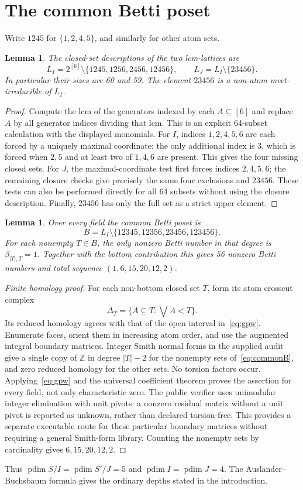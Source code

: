 \documentclass[11pt,a4paper]{article}
\newtheorem{lemma}[theorem]{Lemma}
\theoremstyle{remark}\newtheorem{remark}[theorem]{Remark}
\DeclareMathOperator{\pdim}{pdim}
\begin{document}
\section{The common Betti poset}\label{sec:betti}
Write $1245$ for $\{1,2,4,5\}$, and similarly for other atom sets.
\begin{lemma}\label{lem:lattices}
The closed-set descriptions of the two lcm-lattices are
\[
L_I=2^{[6]}\setminus\{1245,1256,2456,12456\},\qquad
L_J=L_I\setminus\{23456\}.
\]
In particular their sizes are 60 and 59. The element $23456$ is a non-atom meet-irreducible of $L_I$.
\end{lemma}
\begin{proof}
Compute the lcm of the generators indexed by each $A\subseteq[6]$ and replace $A$ by all generator indices dividing that lcm. This is an explicit 64-subset calculation with the displayed monomials. For $I$, indices $1,2,4,5,6$ are each forced by a uniquely maximal coordinate; the only additional index is $3$, which is forced when $2,5$ and at least two of $1,4,6$ are present. This gives the four missing closed sets. For $J$, the maximal-coordinate test first forces indices $2,4,5,6$; the remaining closure checks give precisely the same four exclusions and $23456$. These tests can also be performed directly for all 64 subsets without using the closure description. Finally, $23456$ has only the full set as a strict upper element.
\end{proof}
\begin{lemma}\label{lem:betti}
Over every field the common Betti poset is
\begin{equation}\label{eq:commonB}
B=L_I\setminus\{12345,12356,23456,123456\}.
\end{equation}
For each nonempty $T\in B$, the only nonzero Betti number in that degree is $\beta_{|T|,T}=1$. Together with the bottom contribution this gives 56 nonzero Betti numbers and total sequence $(1,6,15,20,12,2)$.
\end{lemma}
\begin{proof}[Finite homology proof]
For each non-bottom closed set $T$, form its atom crosscut complex
\[
\Delta_T=\{A\subseteq T:\bigvee A<T\}.
\]
Its reduced homology agrees with that of the open interval in~\eqref{eq:gpw}. Enumerate faces, orient them in increasing atom order, and use the augmented integral boundary matrices. Integer Smith normal forms in the supplied audit give a single copy of $\mathbb Z$ in degree $|T|-2$ for the nonempty sets of~\eqref{eq:commonB}, and zero reduced homology for the other sets. No torsion factors occur. Applying~\eqref{eq:gpw} and the universal coefficient theorem proves the assertion for every field, not only characteristic zero. The public verifier uses unimodular integer elimination with unit pivots: a nonzero residual matrix without a unit pivot is reported as unknown, rather than declared torsion-free. This provides a separate executable route for these particular boundary matrices without requiring a general Smith-form library. Counting the nonempty sets by cardinality gives $6,15,20,12,2$.
\end{proof}
Thus $\pdim S/I=\pdim S'/J=5$ and $\pdim I=\pdim J=4$. The Auslander--Buchsbaum formula gives the ordinary depths stated in the introduction.
\end{document}
